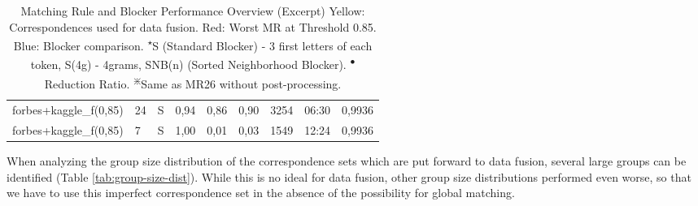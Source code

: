 \documentclass[11pt,titlepage,oneside,openany]{article}
\begin{document}
\begin{table}[]
\begin{tabular}{llcllllll}
		forbes+kaggle\_f(0,85)   & 24 & S        & 0,94 & 0,86 & 0,90 & 3254 & 06:30 & 0,9936 \\
		\rowcolor[HTML]{FCCCC8} 
		forbes+kaggle\_f(0,85)   & 7  & S        & 1,00 & 0,01 & 0,03 & 1549 & 12:24 & 0,9936                       
	\end{tabular}
\caption[Matching Rule and Blocker Performance Overview (Excerpt)]{Matching Rule and Blocker Performance Overview (Excerpt) \medspace\small Yellow: Correspondences used for data fusion. Red: Worst MR at Threshold 0.85. Blue: Blocker comparison. \textsuperscript{$\star$}S (Standard Blocker) - 3 first letters of each token, S(4g) - 4grams, SNB(n) (Sorted Neighborhood Blocker). \textsuperscript{$\bullet$}Reduction Ratio. \textsuperscript{$\divideontimes$}Same as MR26 without post-processing.}
\label{tab:mr-performance}

\end{table}
When analyzing the group size distribution of the correspondence sets which are put forward to data fusion, several large groups can be identified (Table \ref{tab:group-size-dist}). While this is no ideal for data fusion, other group size distributions performed even worse, so that we have to use this imperfect correspondence set in the absence of the possibility for global matching.
\end{document}
